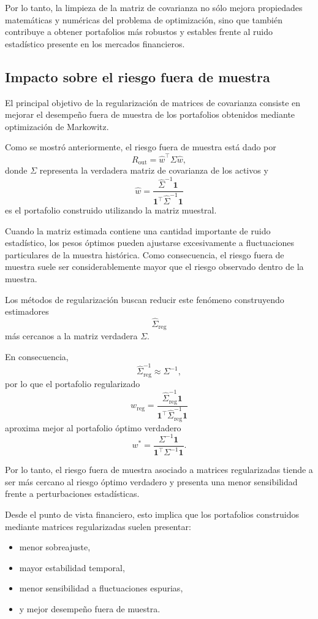 \documentclass[letterpaper,12pt,oneside]{book}
\begin{document}
Por lo tanto, la limpieza de la matriz de covarianza no sólo mejora propiedades matemáticas y numéricas del problema de optimización, sino que también contribuye a obtener portafolios más robustos y estables frente al ruido estadístico presente en los mercados financieros.

\subsection{Impacto sobre el riesgo fuera de muestra}

El principal objetivo de la regularización de matrices de covarianza consiste en mejorar el desempeño fuera de muestra de los portafolios obtenidos mediante optimización de Markowitz.

Como se mostró anteriormente, el riesgo fuera de muestra está dado por
\[
R_{\mathrm{out}}
=
\widehat{w}^{\top}
\Sigma
\widehat{w},
\]
donde \(\Sigma\) representa la verdadera matriz de covarianza de los activos y
\[
\widehat{w}
=
\frac{
\widehat{\Sigma}^{-1}\mathbf{1}
}{
\mathbf{1}^{\top}
\widehat{\Sigma}^{-1}
\mathbf{1}
}
\]
es el portafolio construido utilizando la matriz muestral.

Cuando la matriz estimada contiene una cantidad importante de ruido estadístico, los pesos óptimos pueden ajustarse excesivamente a fluctuaciones particulares de la muestra histórica. Como consecuencia, el riesgo fuera de muestra suele ser considerablemente mayor que el riesgo observado dentro de la muestra.

Los métodos de regularización buscan reducir este fenómeno construyendo estimadores
\[
\widehat{\Sigma}_{\mathrm{reg}}
\]
más cercanos a la matriz verdadera \(\Sigma\).

En consecuencia,
\[
\widehat{\Sigma}_{\mathrm{reg}}^{-1}
\approx
\Sigma^{-1},
\]
por lo que el portafolio regularizado
\[
w_{\mathrm{reg}}
=
\frac{
\widehat{\Sigma}_{\mathrm{reg}}^{-1}\mathbf{1}
}{
\mathbf{1}^{\top}
\widehat{\Sigma}_{\mathrm{reg}}^{-1}
\mathbf{1}
}
\]
aproxima mejor al portafolio óptimo verdadero
\[
w^*
=
\frac{
\Sigma^{-1}\mathbf{1}
}{
\mathbf{1}^{\top}
\Sigma^{-1}
\mathbf{1}
}.
\]

Por lo tanto, el riesgo fuera de muestra asociado a matrices regularizadas tiende a ser más cercano al riesgo óptimo verdadero y presenta una menor sensibilidad frente a perturbaciones estadísticas.

Desde el punto de vista financiero, esto implica que los portafolios construidos mediante matrices regularizadas suelen presentar:
\begin{itemize}
\item menor sobreajuste,
\item mayor estabilidad temporal,
\item menor sensibilidad a fluctuaciones espurias,
\item y mejor desempeño fuera de muestra.
\end{itemize}
\end{document}
